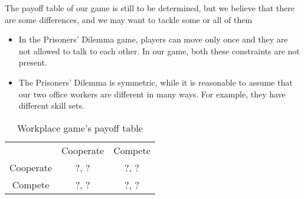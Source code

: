 \documentclass[11pt, a4paper]{article}
\begin{document}
The payoff table of our game is still to be determined, but we believe that there are some differences, and we may want to tackle some or all of them
\begin{itemize}
	\item In the Prisoners' Dilemma game, players can move only once and they are not allowed to talk to each other. In our game, both these constraints are not present.
	\item The Prisoners' Dilemma is symmetric, while it is reasonable to assume that our two office workers are different in many ways. For example, they have different skill sets.
\end{itemize}
\begin{table}[h]
	\centering
	\caption{Workplace game's payoff table}
	\begin{tabular}{c c c}
		          & Cooperate & Compete \\
		Cooperate & ?, ?      & ?, ?    \\
		 Compete  & ?, ?      & ?, ?
	\end{tabular}
\end{table}


\end{document}
